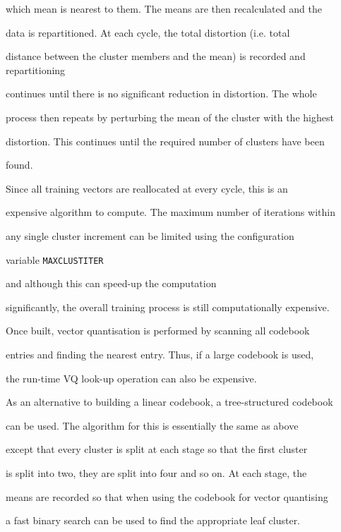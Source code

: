 which mean is nearest to them.  The means are then recalculated and the


data is repartitioned.  At each cycle, the total distortion (i.e. total


distance between the cluster members and the mean) is recorded and repartitioning


continues until there is no significant reduction in distortion.  The whole


process then repeats by perturbing the mean of the cluster with the highest


distortion.  This continues until the required number of clusters have been


found.





Since all training vectors are reallocated at every cycle, this is an


expensive algorithm to compute.  The maximum number of iterations within


any single cluster increment can be limited using the configuration


variable \texttt{MAXCLUSTITER} 


and although this can speed-up the computation


significantly, the overall training process is still computationally expensive.


Once built, vector quantisation is performed by scanning all codebook


entries and finding the nearest entry.  Thus, if a large codebook is used,


the run-time VQ look-up operation can also be expensive.





As an alternative to building a linear codebook, a tree-structured codebook


can be used.  The algorithm for this is essentially the same as above


except that every cluster is split at each stage so that the first cluster


is split into two, they are split into four and so on.  At each stage, the


means are recorded so that when using the codebook for vector quantising


a fast binary search can be used to find the appropriate leaf cluster.


